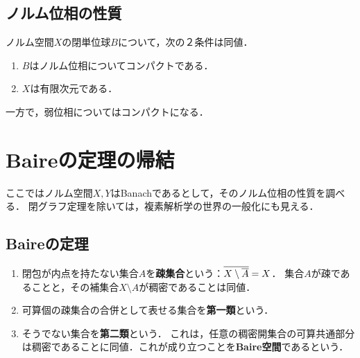 \documentclass[uplatex,dvipdfmx]{jsreport}
\begin{document}
\subsection{ノルム位相の性質}

\begin{proposition}[有限次元空間の特徴付け]\label{prop-unit-ball-in-normed-space}
    ノルム空間$X$の閉単位球$B$について，次の２条件は同値．
    \begin{enumerate}
        \item $B$はノルム位相についてコンパクトである．
        \item $X$は有限次元である．
    \end{enumerate}
\end{proposition}
\begin{remark}
    一方で，弱位相についてはコンパクトになる．
\end{remark}

\section{Baireの定理の帰結}

\begin{tcolorbox}[colframe=ForestGreen, colback=ForestGreen!10!white,breakable,colbacktitle=ForestGreen!40!white,coltitle=black,fonttitle=\bfseries\sffamily,
title=]
    ここではノルム空間$X,Y$はBanachであるとして，そのノルム位相の性質を調べる．
    閉グラフ定理を除いては，複素解析学の世界の一般化にも見える．
\end{tcolorbox}

\subsection{Baireの定理}


\begin{definition}\mbox{}
    \begin{enumerate}
        \item 閉包が内点を持たない集合$A$を\textbf{疎集合}という：$\overline{X\setminus\overline{A}}=X$．
        集合$A$が疎であることと，その補集合$X\setminus A$が稠密であることは同値．
        \item 可算個の疎集合の合併として表せる集合を\textbf{第一類}という．
        \item そうでない集合を\textbf{第二類}という．
        これは，任意の稠密開集合の可算共通部分は稠密であることに同値．これが成り立つことを\textbf{Baire空間}であるという．
    \end{enumerate}
\end{definition}
\end{document}
